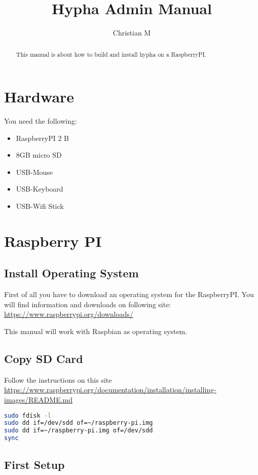 \documentclass[a4paper,11pt]{report}
\title{Hypha Admin Manual}
\author{Christian M}
\begin{document}
\maketitle

\begin{abstract}
	This manual is about how to build and install hypha on a RaspberryPI.
\end{abstract}
\tableofcontents 
\chapter{Hardware}
You need the following:
\begin{itemize}
	\item RaspberryPI 2 B
	\item 8GB micro SD
	\item USB-Mouse
	\item USB-Keyboard
	\item USB-Wifi Stick
\end{itemize}

\chapter{Raspberry PI}

\section{Install Operating System}
First of all you have to download an operating system for the RaspberryPI.
You will find information and downloads on following site: \url{https://www.raspberrypi.org/downloads/}

This manual will work with Raspbian as operating system.

\section{Copy SD Card}
Follow the instructions on this site \url{https://www.raspberrypi.org/documentation/installation/installing-images/README.md}
\begin{lstlisting}[language=bash,caption={copy sd card}]
sudo fdisk -l
sudo dd if=/dev/sdd of=~/raspberry-pi.img
sudo dd if=~/raspberry-pi.img of=/dev/sdd
sync
\end{lstlisting}



\section{First Setup}
\end{document}
